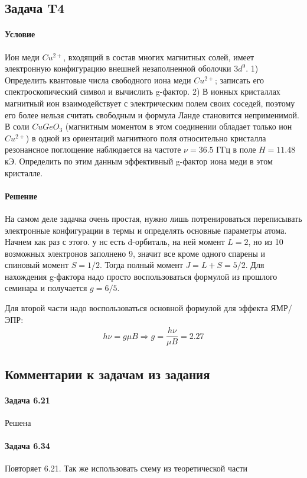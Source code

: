 \documentclass[12pt]{article}
\begin{document}
\subsection{Задача T4}
\label{task_t4}
\paragraph{Условие}
Ион меди $Cu^{2+}$, входящий в состав многих магнитных солей, имеет электронную конфигурацию внешней незаполненной оболочки $3d^9$. 1) Определить квантовые числа свободного иона меди $Cu^{2+}$; записать его спектроскопический символ и вычислить g-фактор. 2) В ионных кристаллах магнитный ион взаимодействует с электрическим полем своих соседей, поэтому его более нельзя считать свободным и формула Ланде становится неприменимой. В соли $CuGeO_3$ (магнитным моментом в этом соединении обладает только ион $Cu^{2+}$) в одной из ориентаций магнитного поля относительно кристалла резонансное поглощение наблюдается на частоте $\nu = 36.5$ ГГц в поле $H = 11.48$ кЭ. Определить по этим данным эффективный g-фактор иона меди в этом кристалле.
\paragraph{Решение}
На самом деле задачка очень простая, нужно лишь потренироваться переписывать электронные конфигурации в термы и определять основные параметры атома. Начнем как раз  с этого. у нс есть d-орбиталь, на ней момент $L=2$, но из 10 возможных электронов заполнено 9, значит все кроме одного спарены и спиновый момент $S=1/2$. Тогда полный момент $J=L+S = 5/2$. Для нахождения g-фактора надо просто воспользоваться формулой из прошлого семинара и получается $g=6/5$.

Для второй части надо воспользоваться основной формулой для эффекта ЯМР/ЭПР:
\begin{gather*}
    h\nu = g\mu B\Rightarrow g = \dfrac{h\nu}{\mu B} = 2.27
\end{gather*}


\subsection{Комментарии к задачам из задания}
\paragraph{Задача 6.21} Решена 
\paragraph{Задача 6.34} Повторяет 6.21. Так же использовать схему из теоретической части
\end{document}
